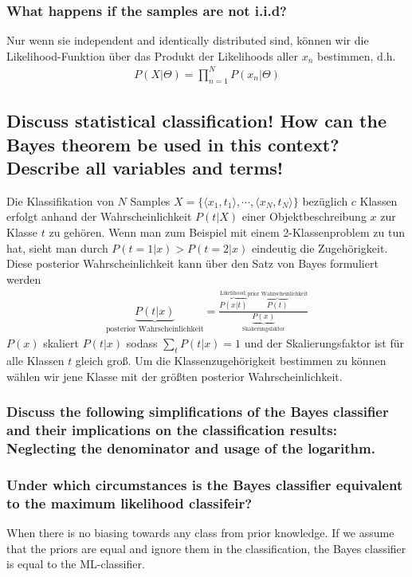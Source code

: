 \documentclass[12pt]{scrartcl}
\begin{document}
\subsubsection{What happens if the samples are not i.i.d?}
\label{iid}Nur wenn sie independent and identically distributed sind, können wir die Likelihood-Funktion über das Produkt der Likelihoods aller $x_n$ bestimmen, d.h.
\begin{align*}
P(X|\Theta) = \prod_{n=1}^N P(x_n|\Theta)
\end{align*}

\subsection{Discuss statistical classification! How can the Bayes theorem be used in this context? Describe all variables and terms!}

Die Klassifikation von $N$ Samples $X=\{\langle x_1,t_1 \rangle, \cdots , \langle x_N,t_N \rangle\}$ bezüglich $c$ Klassen erfolgt anhand der Wahrscheinlichkeit $P(t|X)$ einer Objektbeschreibung $x$ zur Klasse $t$ zu gehören. Wenn man zum Beispiel mit einem 2-Klassenproblem zu tun hat, sieht man durch $P(t=1|x) > P(t=2|x)$ eindeutig die Zugehörigkeit. \\
\label{bayes}Diese posterior Wahrscheinlichkeit kann über den Satz von Bayes formuliert werden
\begin{align*}
\underbrace{P(t|x)}_{\text{posterior Wahrscheinlichkeit}} = \frac{\overbrace{P(x|t)}^{\text{Likelihood;}} \overbrace{P(t)}^{\text{prior Wahrscheinlichkeit}}}{\underbrace{P(x)}_{\text{Skalierungsfaktor}}}
\end{align*}
$P(x)$ skaliert $P(t|x)$ sodass $\sum_t P(t|x) = 1$ und der Skalierungsfaktor ist für alle Klassen $t$ gleich groß. Um die Klassenzugehörigkeit bestimmen zu können wählen wir jene Klasse mit der größten posterior Wahrscheinlichkeit. \\

\subsubsection{Discuss the following simplifications of the Bayes classifier and their implications on the classification results: Neglecting the denominator and usage of the logarithm.}

\subsubsection{Under which circumstances is the Bayes classifier equivalent to the maximum likelihood classifeir?}
When there is no biasing towards any class from prior knowledge. If we assume that the priors are equal and ignore them in the classification, the Bayes classifier is equal to the ML-classifier.
\end{document}
